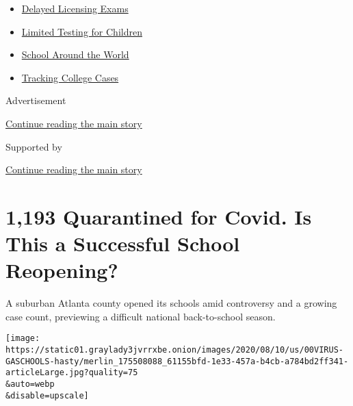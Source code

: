 \begin{itemize}
\tightlist
\item
  \href{https://www.nytimes3xbfgragh.onion/2020/09/04/us/bar-exam-coronavirus.html?name=styln-coronavirus-schools-reopening\&region=TOP_BANNER\&block=storyline_menu_recirc\&action=click\&pgtype=Article\&impression_id=4ed13300-f2a5-11ea-ac64-8d7d25b062bd\&variant=undefined}{Delayed
  Licensing Exams}
\item
  \href{https://www.nytimes3xbfgragh.onion/2020/09/08/upshot/children-testing-shortfalls-virus.html?name=styln-coronavirus-schools-reopening\&region=TOP_BANNER\&block=storyline_menu_recirc\&action=click\&pgtype=Article\&impression_id=4ed13301-f2a5-11ea-ac64-8d7d25b062bd\&variant=undefined}{Limited
  Testing for Children}
\item
  \href{https://www.nytimes3xbfgragh.onion/2020/09/01/world/schools-reopen-globe-students.html?name=styln-coronavirus-schools-reopening\&region=TOP_BANNER\&block=storyline_menu_recirc\&action=click\&pgtype=Article\&impression_id=4ed13302-f2a5-11ea-ac64-8d7d25b062bd\&variant=undefined}{School
  Around the World}
\item
  \href{https://www.nytimes3xbfgragh.onion/interactive/2020/us/covid-college-cases-tracker.html?name=styln-coronavirus-schools-reopening\&region=TOP_BANNER\&block=storyline_menu_recirc\&action=click\&pgtype=Article\&impression_id=4ed15a10-f2a5-11ea-ac64-8d7d25b062bd\&variant=undefined}{Tracking
  College Cases}
\end{itemize}

Advertisement

\protect\hyperlink{after-top}{Continue reading the main story}

Supported by

\protect\hyperlink{after-sponsor}{Continue reading the main story}

\hypertarget{1193-quarantined-for-covid-is-this-a-successful-school-reopening}{%
\section{1,193 Quarantined for Covid. Is This a Successful School
Reopening?}\label{1193-quarantined-for-covid-is-this-a-successful-school-reopening}}

A suburban Atlanta county opened its schools amid controversy and a
growing case count, previewing a difficult national back-to-school
season.

\texttt{[image: https://static01.graylady3jvrrxbe.onion/images/2020/08/10/us/00VIRUS-GASCHOOLS-hasty/merlin\_175508088\_61155bfd-1e33-457a-b4cb-a784bd2ff341-articleLarge.jpg?quality=75\\\&auto=webp\\\&disable=upscale]}

